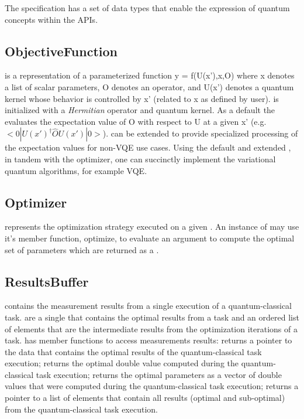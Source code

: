 The \qcor specification has a set of data types that enable the expression of quantum concepts within the \qcor \ac{API}s.

\subsection{\textbf{ObjectiveFunction}}\label{subsec:ObjectiveFunction}
 is a representation of a parameterized function y = f(U(x'),x,O)
where x denotes a list of scalar parameters, O denotes an operator, and U(x') denotes a quantum kernel whose behavior is controlled by x' (related to x as defined by user).  is initialized with a {\em Hermitian} operator and quantum kernel. As a default the  evaluates the expectation value of O with respect to U at a given x' (e.g. $<0|U(x')^\dagger \hat{O} U(x')|0>$).  can be extended to provide specialized processing of the expectation values for non-VQE use cases. Using the default and extended , in tandem with the optimizer, one can succinctly implement the variational quantum algorithms, for example VQE. 

\subsection{\textbf{Optimizer}}\label{subsec:Optimizer}
 represents the optimization strategy executed on a given . An instance of  may use it's member function, optimize, to evaluate an  argument to compute the optimal set of parameters which are returned as a .


\subsection{\textbf{ResultsBuffer}}\label{subsec:ResultsBuffer}
 contains the measurement results from a single execution of a quantum-classical task.  are a single  that contains the optimal results from a task and an ordered list of  elements that are the intermediate results from the optimization iterations of a task.  has member functions to access measurements results:  returns a pointer to the  data that contains the optimal results of the quantum-classical task execution;  returns the optimal double value computed during the quantum-classical task execution;  returns the optimal parameters as a vector of double values that were computed during the quantum-classical task execution;  returns a pointer to a list of  elements that contain all results (optimal and sub-optimal) from the quantum-classical task execution.

